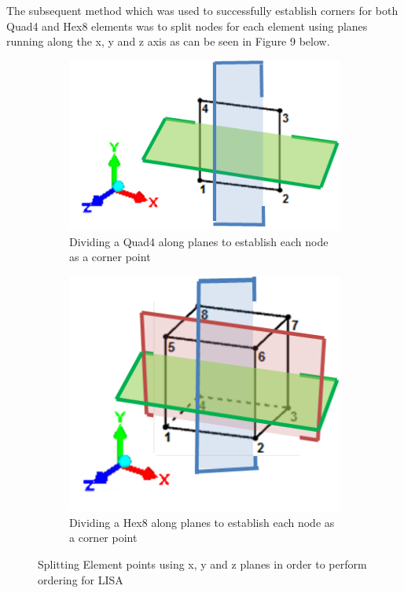 The subsequent method which was used to successfully establish corners for both Quad4 and Hex8 elements was to split nodes for each element using planes running along the x, y and z axis as can be seen in Figure 9 below.

\begin{figure}[!h]
\centering
\begin{subfigure}{.5\textwidth}
  \centering
  \includegraphics[width=0.9\linewidth]{../Graphics/SortingQuad4.png}
  \caption{Dividing a Quad4 along planes to establish each node as a corner point}
  \label{fig:sub1}
\end{subfigure}%
\begin{subfigure}{.5\textwidth}
  \centering
  \includegraphics[width=0.7\linewidth]{../Graphics/SortingHex8.png}
  \caption{Dividing a Hex8 along planes to establish each node as a corner point}
  \label{fig:sub2}
\end{subfigure}
\caption{Splitting Element points using x, y and z planes in order to perform ordering for LISA}
\label{fig:test}
\end{figure}



